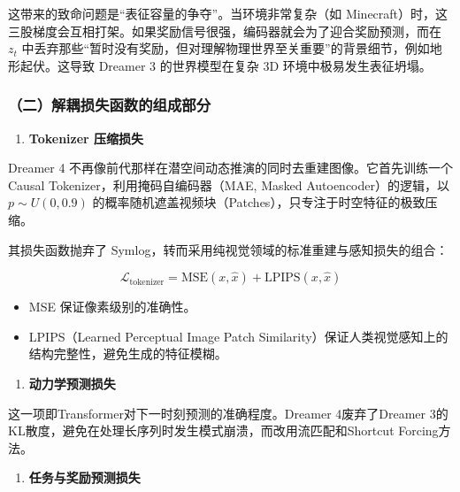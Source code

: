 这带来的致命问题是``表征容量的争夺''。当环境非常复杂（如 Minecraft）时，这三股梯度会互相打架。如果奖励信号很强，编码器就会为了迎合奖励预测，而在 \(z_t\) 中丢弃那些``暂时没有奖励，但对理解物理世界至关重要''的背景细节，例如地形起伏。这导致 Dreamer 3 的世界模型在复杂 3D 环境中极易发生表征坍塌。

\hypertarget{ux4e8cux89e3ux8026ux635fux5931ux51fdux6570ux7684ux7ec4ux6210ux90e8ux5206}{%
\subsubsection{（二）解耦损失函数的组成部分}\label{ux4e8cux89e3ux8026ux635fux5931ux51fdux6570ux7684ux7ec4ux6210ux90e8ux5206}}

\begin{enumerate}
\def\labelenumi{\arabic{enumi}.}
\tightlist
\item
  \textbf{Tokenizer 压缩损失}
\end{enumerate}

Dreamer 4 不再像前代那样在潜空间动态推演的同时去重建图像。它首先训练一个 Causal Tokenizer，利用掩码自编码器（MAE, Masked Autoencoder）的逻辑，以 \(p \sim U(0, 0.9)\) 的概率随机遮盖视频块（Patches），只专注于时空特征的极致压缩。

其损失函数抛弃了 Symlog，转而采用纯视觉领域的标准重建与感知损失的组合：

\[
\mathcal{L}_{\mathrm{tokenizer}}=\mathrm{MSE}(x, \hat{x})+\mathrm{LPIPS}(x, \hat{x})
\]

\begin{itemize}
\tightlist
\item
  MSE 保证像素级别的准确性。
\item
  LPIPS（Learned Perceptual Image Patch Similarity）保证人类视觉感知上的结构完整性，避免生成的特征模糊。
\end{itemize}

\begin{enumerate}
\def\labelenumi{\arabic{enumi}.}
\setcounter{enumi}{1}
\tightlist
\item
  \textbf{动力学预测损失}
\end{enumerate}

这一项即Transformer对下一时刻预测的准确程度。Dreamer 4废弃了Dreamer 3的KL散度，避免在处理长序列时发生模式崩溃，而改用流匹配和Shortcut Forcing方法。

\begin{enumerate}
\def\labelenumi{\arabic{enumi}.}
\setcounter{enumi}{2}
\tightlist
\item
  \textbf{任务与奖励预测损失}
\end{enumerate}

